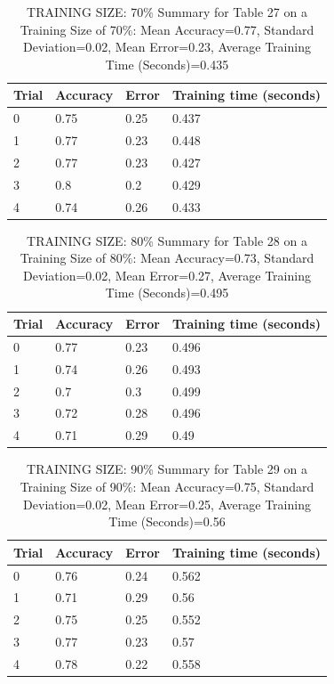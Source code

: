 \documentclass{article}
\begin{document}
\begin{table}[H]

\centering
{\begin{tabular}{||p{1cm}|p{1.8cm}|p{1.8cm}|p{3cm}||}
 \hline
Trial & Accuracy & Error & Training time (seconds) \\ [0.5ex] 
 \hline\hline
   0 & 0.75 & 0.25 & 0.437\\
\hline
   1 & 0.77 & 0.23 & 0.448\\
\hline
   2 & 0.77 & 0.23 & 0.427\\
\hline
   3 & 0.8 & 0.2 & 0.429\\
\hline
   4 & 0.74 & 0.26 & 0.433\\
\hline
\end{tabular}}
\caption{TRAINING SIZE: 70\% \newline Summary for Table 27 on a Training Size of 70\%: Mean Accuracy=0.77, Standard Deviation=0.02, Mean Error=0.23, Average Training Time (Seconds)=0.435}
\end{table} 

\begin{table}[H]

\centering
{\begin{tabular}{||p{1cm}|p{1.8cm}|p{1.8cm}|p{3cm}||}
 \hline
Trial & Accuracy & Error & Training time (seconds) \\ [0.5ex] 
 \hline\hline
   0 & 0.77 & 0.23 & 0.496\\
\hline
   1 & 0.74 & 0.26 & 0.493\\
\hline
   2 & 0.7 & 0.3 & 0.499\\
\hline
   3 & 0.72 & 0.28 & 0.496\\
\hline
   4 & 0.71 & 0.29 & 0.49\\
\hline
\end{tabular}}
\caption{TRAINING SIZE: 80\% \newline Summary for Table 28 on a Training Size of 80\%: Mean Accuracy=0.73, Standard Deviation=0.02, Mean Error=0.27, Average Training Time (Seconds)=0.495}
\end{table} 

\begin{table}[H]

\centering
{\begin{tabular}{||p{1cm}|p{1.8cm}|p{1.8cm}|p{3cm}||}
 \hline
Trial & Accuracy & Error & Training time (seconds) \\ [0.5ex] 
 \hline\hline
   0 & 0.76 & 0.24 & 0.562\\
\hline
   1 & 0.71 & 0.29 & 0.56\\
\hline
   2 & 0.75 & 0.25 & 0.552\\
\hline
   3 & 0.77 & 0.23 & 0.57\\
\hline
   4 & 0.78 & 0.22 & 0.558\\
\hline
\end{tabular}}
\caption{TRAINING SIZE: 90\% \newline Summary for Table 29 on a Training Size of 90\%: Mean Accuracy=0.75, Standard Deviation=0.02, Mean Error=0.25, Average Training Time (Seconds)=0.56}
\end{table} 
\end{document}
